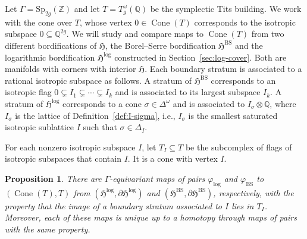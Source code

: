 \documentclass[12 pt]{amsart}
\newcommand{\fH}{\mathfrak H}
\newcommand{\QQ}{\mathbb{Q}}
\newcommand{\ZZ}{\mathbb{Z}}
\newcommand{\BS}{\mathrm{BS}}
\newcommand{\Sp}{\mathrm{Sp}}
\newcommand{\Cone}{\operatorname{Cone}}
\newcommand{\<}{\langle}
\renewcommand{\>}{\rangle}
\newtheorem{proposition}[theorem]{Proposition}
\theoremstyle{definition}
\begin{document}
\medskip

Let $\Gamma = \Sp_{2g}(\ZZ)$ and let $T = T^\omega_g(\QQ)$ be the symplectic Tits building.  We work with the cone over $T$, whose vertex $0 \in \Cone(T)$ corresponds to the isotropic subspace $0 \subseteq \QQ^{2g}$. We will study and compare maps to $\Cone(T)$ from two different bordifications of $\fH$, the Borel--Serre bordification $\fH^{\BS}$ and the logarithmic bordification $\fH^{\log}$ constructed in Section~\ref{sec:log-cover}. Both are manifolds with corners with interior $\fH$. Each boundary stratum is associated to a rational isotropic subspace as follows. A stratum of $\fH^{\BS}$ corresponds to an isotropic flag $0 \subsetneq I_1 \subsetneq \cdots \subsetneq I_k$ and is associated to its largest subspace $I_k$. A stratum of $\fH^{\log}$ corresponds to a cone $\sigma \in \Delta^\omega$ and is associated to $I_\sigma \otimes \QQ$, where $I_\sigma$ is the lattice of Definition~\ref{def:I-sigma}, i.e., $I_\sigma$ is the smallest saturated isotropic sublattice $I$ such that $\sigma \in \Delta_I$.

For each nonzero isotropic subspace $I$, let $T_I \subseteq T$ be the subcomplex of flags of isotropic subspaces that contain $I$. It is a cone with vertex $I$.

\begin{proposition}\label{prop:boundary-maps}
There are $\Gamma$-equivariant maps of pairs $\varphi_{\log}$ and $\varphi_{\BS}$ to $(\Cone(T),T)$ from $(\fH^{\log}, \partial \fH^{\log})$ and $(\fH^{\BS}, \partial \fH^{\BS})$, respectively, with the property that the image of a boundary stratum associated to $I$ lies in $T_I$. Moreover, each of these maps is unique up to a homotopy through maps of pairs with the same property.
\end{proposition}
\end{document}
